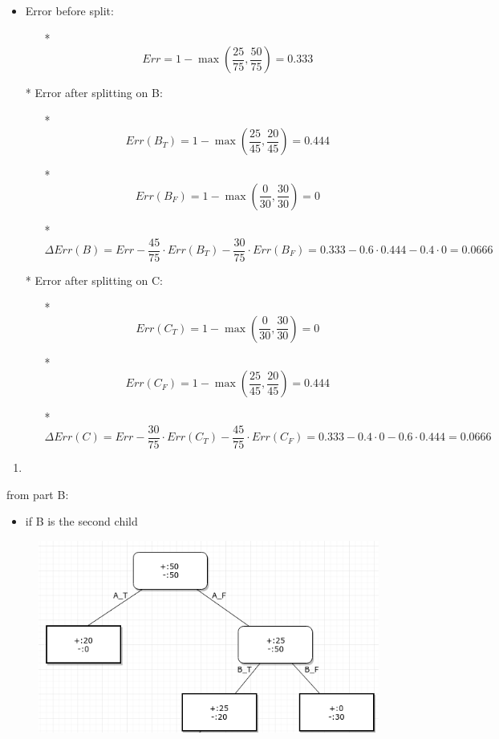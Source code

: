 \documentclass[11pt]{article}
\makeatletter
\def\maxwidth{\ifdim\Gin@nat@width>\linewidth\linewidth
    \else\Gin@nat@width\fi}
\let\Oldincludegraphics\includegraphics
\renewcommand{\includegraphics}[1]{\Oldincludegraphics[width=.8\maxwidth]{#1}}
\providecommand{\tightlist}{%
      \setlength{\itemsep}{0pt}\setlength{\parskip}{0pt}}
\makeatother
\begin{document}
\begin{itemize}
\tightlist
\item
  Error before split:

  \begin{itemize}
  \tightlist
  \item[*]
    \[Err = 1-\max(\frac{25}{75}, \frac{50}{75}) = 0.333\]
  \end{itemize}
\item[*]
  Error after splitting on B:

  \begin{itemize}
  \tightlist
  \item[*]
    \[Err(B_T) = 1-\max(\frac{25}{45}, \frac{20}{45}) = 0.444\]
  \item[*]
    \[Err(B_F) = 1-\max(\frac{0}{30}, \frac{30}{30}) = 0\]
  \item[*]
    \[\Delta Err(B) = Err- \frac{45}{75} \cdot Err(B_T) - \frac{30}{75} \cdot Err(B_F) = 0.333 - 0.6  \cdot 0.444 - 0.4 \cdot 0 = 0.0666\]
  \end{itemize}
\item[*]
  Error after splitting on C:

  \begin{itemize}
  \tightlist
  \item[*]
    \[Err(C_T) = 1-\max(\frac{0}{30}, \frac{30}{30}) = 0\]
  \item[*]
    \[Err(C_F) = 1-\max(\frac{25}{45}, \frac{20}{45}) = 0.444\]
  \item[*]
    \[\Delta Err(C) = Err- \frac{30}{75} \cdot Err(C_T) - \frac{45}{75} \cdot Err(C_F) = 0.333 - 0.4 \cdot 0 - 0.6 \cdot 0.444 = 0.0666\]
  \end{itemize}
\end{itemize}



    \begin{enumerate}
\def\labelenumi{(\alph{enumi})}
\setcounter{enumi}{2}
\item
\end{enumerate}

from part B:

\begin{itemize}
\tightlist
\item
  if B is the second child
\end{itemize}

\begin{figure}[H]
	\centering
	\includegraphics{7.png}
	\caption{}
\end{figure}
\end{document}
